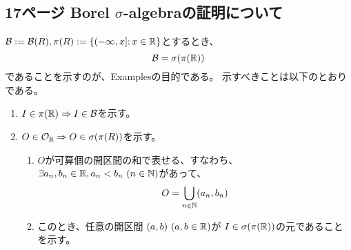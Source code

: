     \subsection{17ページ Borel $\sigma$-algebraの証明について}
        ${\mathcal{B}} := {\mathcal{B}}(R), \pi(R) :=\{(-\infty, x];x\in{\mathbb{R}}\}$とするとき、
        \[
            {\mathcal{B}} = \sigma(\pi({\mathbb{R}}))
        \]
        であることを示すのが、Examplesの目的である。
        示すべきことは以下のとおりである。
        \begin{enumerate}[font = \bfseries, label = step \arabic*.]
            \item $I\in\pi({\mathbb{R}})\Rightarrow I\in {\mathcal{B}}$を示す。
            \item $O\in\mathcal{O}_{{\mathbb{R}}} \Rightarrow O \in \sigma(\pi(R))$を示す。
            \begin{enumerate}
                \item $O$が可算個の開区間の和で表せる、すなわち、
                    $\exists a_n, b_n\in\RR, a_n < b_n\ (n\in\NN)$があって、
                    \[
                        O = \bigcup_{n\in {\mathbb{N}}}(a_n, b_n)
                    \]
                \item このとき、任意の開区間
                    $(a, b)\ (a, b\in {\mathbb{R}})$が
                    $I\in\sigma(\pi({\mathbb{R}}))$の元であることを示す。
            \end{enumerate}
        \end{enumerate}
